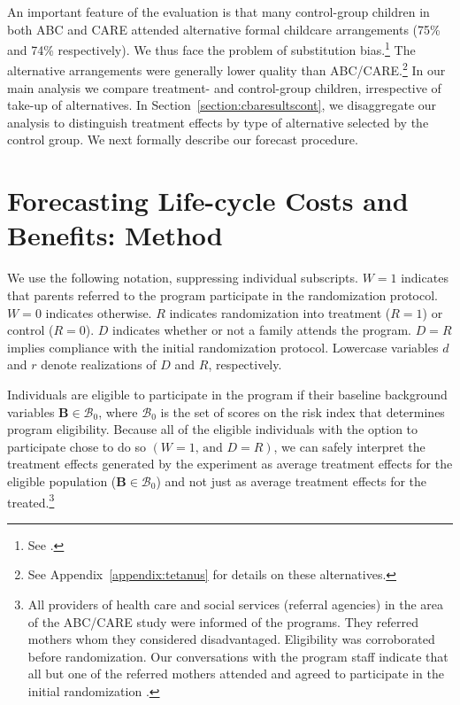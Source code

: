 An important feature of the evaluation is that many control-group children in both ABC and CARE attended alternative formal childcare arrangements (75\% and 74\% respectively). We thus face the problem of substitution bias.\footnote{See \citet{Heckman_1992_randomization,Heckman_Hohmann_etal_2000_QJE,Kline_Walters_2016_QJE}.} The alternative arrangements were generally lower quality than ABC/CARE.\footnote{See Appendix~\ref{appendix:tetanus} for details on these alternatives.} In our main analysis we compare treatment- and control-group children, irrespective of take-up of alternatives. In Section~\ref{section:cbaresultscont}, we disaggregate our analysis to distinguish treatment effects by type of alternative selected by the control group. We next formally describe our forecast procedure.

\section{Forecasting Life-cycle Costs and Benefits: Method} \label{section:cbamethodology}

We use the following notation, suppressing individual subscripts. $W=1$ indicates that parents referred to the program participate in the randomization protocol. $W=0$ indicates otherwise. $R$ indicates randomization into treatment ($R = 1$) or control ($R = 0$). $D$ indicates whether or not a family attends the program. $D = R$ implies compliance with the initial randomization protocol. Lowercase variables $d$ and $r$ denote realizations of $D$ and $R$, respectively.

Individuals are eligible to participate in the program if their baseline background variables $\bm{B}\in\mathcal{B}_0$, where $\mathcal{B}_0$ is the set of scores on the risk index that determines program eligibility. Because all of the eligible individuals with the option to participate chose to do so $(W=1\text{, and } D=R)$, we can safely interpret the treatment effects generated by the experiment as average treatment effects for the eligible population ($\bm{B}\in\mathcal{B}_0$) and not just as average treatment effects for the treated.\footnote{All providers of health care and social services (referral agencies) in the area of the ABC/CARE study were informed of the programs. They referred mothers whom they considered disadvantaged. Eligibility was corroborated before randomization. Our conversations with the program staff indicate that all but one of the referred mothers attended and agreed to participate in the initial randomization \citep{Ramey-etal_2012-ABC}.}

